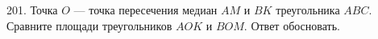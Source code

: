 201. Точка $O$ --- точка пересечения медиан $AM$ и $BK$ треугольника $ABC.$ Сравните площади треугольников $AOK$ и $BOM.$ Ответ обосновать.\\
